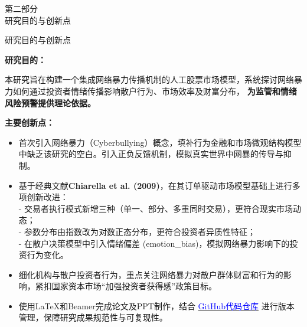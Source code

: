 \begin{frame}
    \begin{center}
        \textcolor{NJU_purple}{\Large 第二部分} \\[1.5em]
        \textcolor{NJU_purple}{\Huge 研究目的与创新点}
    \end{center}
\end{frame}



\begin{frame}{研究目的与创新点}

    
    \justifying
    \footnotesize
    \setlength{\parskip}{0.3em}
    
    
    \textbf{\large 研究目的：}
    
    \vspace{0.2cm} %
    
    本研究旨在构建一个集成网络暴力传播机制的人工股票市场模型，系统探讨网络暴力如何通过投资者情绪传播影响散户行为、市场效率及财富分布，
    \alert{\textbf{为监管和情绪风险预警提供理论依据。}}
    
    \vspace{0.5cm}
    
    \textbf{\large 主要创新点：}
    \begin{itemize}
      \item \alert{首次引入网络暴力（Cyberbullying）概念}，填补行为金融和市场微观结构模型中缺乏该研究的空白。引入\alert{正负反馈机制}，模拟真实世界中网暴的传导与抑制。
      
      \item 基于经典文献\textbf{Chiarella et al. (2009)}，在其订单驱动市场模型基础上进行多项创新改进：\\
      \hspace{1em} - 交易者执行模式新增三种（单一、部分、多重同时交易），更符合现实市场动态；\\
      \hspace{1em} - 参数分布由指数改为\alert{对数正态分布}，更符合投资者异质性特征；\\
      \hspace{1em} - 在散户决策模型中引入\alert{情绪偏差 (emotion\_bias)}，模拟网络暴力影响下的投资行为变化。
      
      \item 细化机构与散户投资者行为，重点关注网络暴力对\alert{散户群体财富和行为}的影响，紧扣国家资本市场“加强投资者获得感”政策目标。
      
      \item 使用\alert{LaTeX和Beamer完成论文及PPT制作}，结合
      \href{https://github.com/haofeixin/Graduaction-Project}{\textcolor{blue}{GitHub代码仓库}}
      进行版本管理，保障研究成果规范性与可复现性。
    \end{itemize}
    
    \end{frame}
    